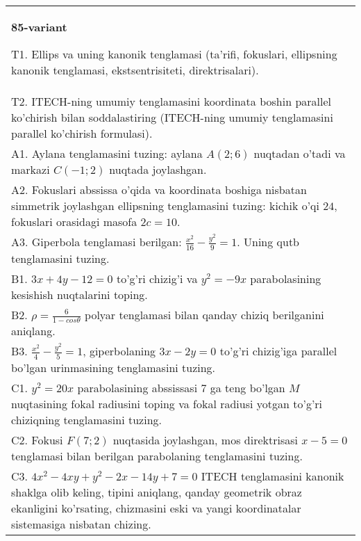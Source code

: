 \documentclass{article}
\begin{document}
\begin{tabular}{m{17cm}}
\textbf{85-variant}
\newline

T1. Ellips va uning kanonik tenglamasi (ta'rifi, fokuslari, ellipsning kanonik tenglamasi, ekstsentrisiteti, direktrisalari).\\

T2. ITECH-ning umumiy tenglamasini koordinata boshin parallel ko'chirish bilan soddalastiring (ITECH-ning umumiy tenglamasini parallel ko'chirish formulasi).\\

A1. Aylana tenglamasini tuzing: aylana $A(2;6)$ nuqtadan o'tadi va markazi $C(-1;2)$ nuqtada joylashgan.\\

A2. Fokuslari abssissa o'qida va koordinata boshiga nisbatan simmetrik joylashgan ellipsning tenglamasini tuzing: kichik o'qi $24$, fokuslari orasidagi masofa $2c=10$.\\

A3. Giperbola tenglamasi berilgan: $\frac{x^{2}}{16}-\frac{y^{2}}{9}=1$. Uning qutb tenglamasini tuzing.\\

B1. $3x + 4y - 12 = 0$ to'g'ri chizig'i va $y^{2} = - 9x$ parabolasining kesishish nuqtalarini toping.\\

B2. $\rho = \frac{6}{1 - cos\theta}$ polyar tenglamasi bilan qanday chiziq berilganini aniqlang.  \\

B3. $\frac{x^{2}}{4} - \frac{y^{2}}{5} = 1$, giperbolaning $3x - 2y = 0$ to'g'ri chizig'iga parallel bo'lgan urinmasining tenglamasini tuzing.  \\

C1. $y^{2} = 20x$ parabolasining abssissasi 7 ga teng bo'lgan $M$ nuqtasining fokal radiusini toping va fokal radiusi yotgan to'g'ri chiziqning tenglamasini tuzing.  \\

C2. Fokusi $F(7;2)$ nuqtasida joylashgan, mos direktrisasi $x - 5 = 0$ tenglamasi bilan berilgan parabolaning tenglamasini tuzing.  \\

C3. $4x^{2} - 4xy + y^{2} - 2x - 14y + 7 = 0$ ITECH tenglamasini kanonik shaklga olib keling, tipini aniqlang, qanday geometrik obraz ekanligini ko'rsating, chizmasini eski va yangi koordinatalar sistemasiga nisbatan chizing.  \\

\end{tabular}
\vspace{1cm}
\end{document}
